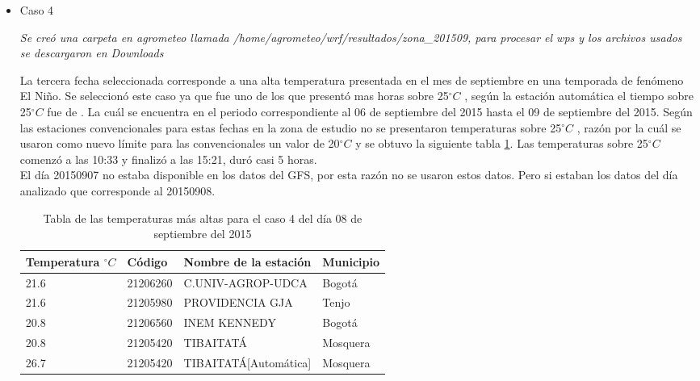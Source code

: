\documentclass[11pt]{article}
\def\celc{$^{\circ}C$ }%
\begin{document}
\begin{itemize}
\begin{table}[H]
\end{table}



\item{Caso 4}


\textit{Se creó una carpeta en agrometeo llamada /home/agrometeo/wrf/resultados/zona\_201509, para procesar el wps y los archivos usados se descargaron en Downloads}

La tercera fecha seleccionada corresponde a una alta temperatura presentada en el mes de septiembre en una temporada de fenómeno El Niño. Se seleccionó este caso ya que fue uno de los que presentó mas horas sobre 25\celc, según la estación automática el tiempo sobre 25\celc fue de . La cuál se encuentra en el periodo correspondiente al 06 de septiembre del 2015 hasta el 09 de septiembre del 2015. Según las estaciones convencionales para estas fechas en la zona de estudio no se presentaron temperaturas sobre 25\celc, razón por la cuál se usaron como nuevo límite para las convencionales un valor de 20\celc y se obtuvo la siguiente tabla \ref{table:caso4}. Las temperaturas sobre 25\celc comenzó a las 10:33 y finalizó a las 15:21, duró casi 5 horas.\\

El día 20150907 no estaba disponible en los datos del GFS, por esta razón no se usaron estos datos. Pero si estaban los datos del día analizado que corresponde al 20150908.

\begin{table}[H]
\centering

\begin{tabular}{llll}
Temperatura \celc & Código   & Nombre de la estación & Municipio \\ \hline
21.6           & 21206260 & C.UNIV-AGROP-UDCA   & Bogotá \\
21.6           & 21205980 & PROVIDENCIA GJA   & Tenjo \\
20.8           & 21206560 & INEM KENNEDY     & Bogotá \\
20.8           & 21205420 & TIBAITATÁ   & Mosquera \\
26.7         & 21205420 & TIBAITATÁ[Automática] & Mosquera
\end{tabular}
\caption{Tabla de las temperaturas más altas para el caso 4 del día 08 de septiembre del 2015}
\label{table:caso4}



\end{table}


\end{itemize}
\end{document}
